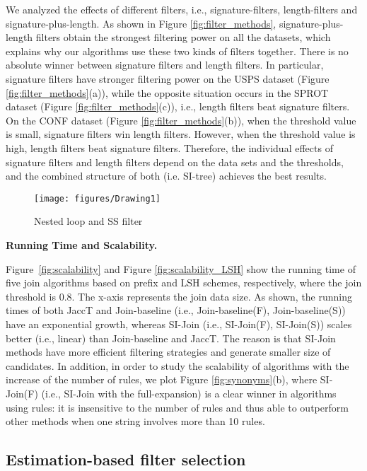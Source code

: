 We analyzed the effects of different filters, i.e., signature-filters, length-filters and  signature-plus-length. As shown in Figure \ref{fig:filter_methods},  signature-plus-length filters obtain the strongest filtering power on all the datasets, which explains why our algorithms use these two kinds of filters together. There is no absolute winner between signature filters and length filters. In particular, signature filters have stronger filtering power on the USPS dataset (Figure \ref{fig:filter_methods}(a)), while the opposite situation occurs in the SPROT dataset (Figure \ref{fig:filter_methods}(c)), i.e., length filters beat signature filters. On the CONF dataset (Figure \ref{fig:filter_methods}(b)), when the threshold value is small, signature filters win length filters. However, when the threshold value is high, length filters beat signature filters. Therefore, the individual effects of signature filters and length filters depend on the data sets and the thresholds, and the combined structure of both (i.e. SI-tree) achieves the best results.



\begin{figure}[t]
	\centering
	\texttt{[image: figures/Drawing1]}
	\caption{Nested loop and SS filter}
	\label{fig:similaritygeaph}
\end{figure}


\textbf{Running Time and Scalability.}


Figure~\ref{fig:scalability} and Figure \ref{fig:scalability_LSH} show the running time of five join algorithms based on prefix and LSH schemes, respectively, where the join threshold is $0.8$. The x-axis represents the join data size. As shown, the running times of both JaccT and Join-baseline (i.e., Join-baseline(F), Join-baseline(S)) have an exponential growth, whereas SI-Join (i.e., SI-Join(F), SI-Join(S))  scales better (i.e., linear) than Join-baseline and JaccT. The reason is that SI-Join methods have more efficient filtering strategies and generate smaller size of candidates.  In addition, in order to study the scalability of algorithms with the increase of the number of rules, we plot Figure \ref{fig:synonyms}(b), where  SI-Join(F) (i.e., SI-Join with the full-expansion) is a clear winner in algorithms using rules: it is insensitive to the number of rules and thus able
to outperform other methods when one string involves more than 10 rules.


\smallskip

\subsection{Estimation-based filter selection}

